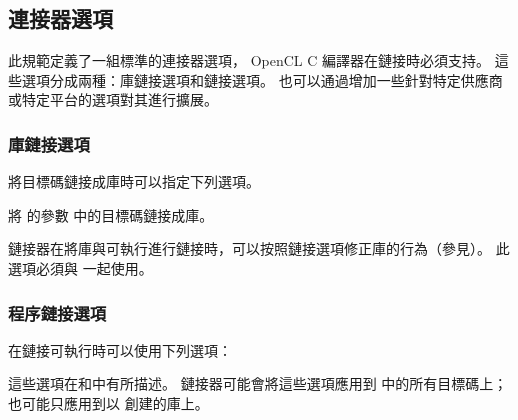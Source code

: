\subsection{連接器選項}

此規範定義了一組標準的連接器選項， OpenCL C 編譯器在鏈接時必須支持。
這些選項分成兩種：庫鏈接選項和鏈接選項。
也可以通過增加一些針對特定供應商或特定平台的選項對其進行擴展。

\subsubsection{庫鏈接選項}

將目標碼鏈接成庫時可以指定下列選項。

將  的參數  中的目標碼鏈接成庫。
\stopclOption

鏈接器在將庫與可執行進行鏈接時，可以按照鏈接選項修正庫的行為（參見）。
此選項必須與  一起使用。
\stopclOption

\subsubsection[tit:programLinkOption]{程序鏈接選項}

在鏈接可執行時可以使用下列選項：
\startigBase
\item {}
\item {}
\item {}
\item {}
\item {}
\stopigBase

這些選項在和中有所描述。
鏈接器可能會將這些選項應用到  中的所有目標碼上；
也可能只應用到以  創建的庫上。
